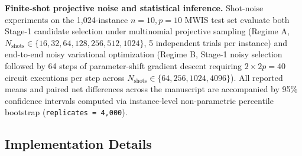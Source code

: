 \documentclass[10pt,a4paper]{article}
\begin{document}
\textbf{Finite-shot projective noise and statistical inference.} Shot-noise experiments on the 1,024-instance $n = 10, p = 10$ MWIS test set evaluate both Stage-1 candidate selection under multinomial projective sampling (Regime A, $N_{\mathrm{shots}} \in \{16, 32, 64, 128, 256, 512, 1024\}$, 5 independent trials per instance) and end-to-end noisy variational optimization (Regime B, Stage-1 noisy selection followed by 64 steps of parameter-shift gradient descent requiring $2 \times 2p = 40$ circuit executions per step across $N_{\mathrm{shots}} \in \{64, 256, 1024, 4096\}$). All reported means and paired net differences across the manuscript are accompanied by 95\% confidence intervals computed via instance-level non-parametric percentile bootstrap (\texttt{replicates = 4,000}).


\subsection*{Implementation Details}
\end{document}
